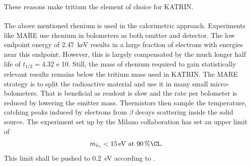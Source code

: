     These reasons make tritium the element of choice for KATRIN.\\\\
    The above mentioned rhenium is used in the calorimetric approach. Experiments like MARE \cite{MARE2007} use rhenium in bolometers as both emitter and detector. The low endpoint energy of \SI{2.47}{\kilo\electronvolt} results in a large fraction of electrons with energies near this endpoint. However, this is largely compensated by the much longer half life of $t_{1/2} = $\SI{4.32 e 10}{\year}. Still, the mass of rhenium required to gain statistically relevant results remains below the tritium mass used in KATRIN. The MARE strategy is to split the radioactive material and use it in many small micro-bolometers. That is beneficial as readout is slow and the rate per bolometer is reduced by lowering the emitter mass. Thermistors then sample the temperature, catching peaks induced by electrons from $\beta$ decays scattering inside the solid source.
    The experiment set up by the Milano collaboration has set an upper limit of
    \begin{equation}
    	m_{\bar\nu_e} < \SI{15}{\electronvolt} ~ {\rm at}~ \SI{90}{\percent\CL}.
    \end{equation}
    This limit shall be pushed to \SI{0.2}{\electronvolt} according to \cite{MARE2007}.  

